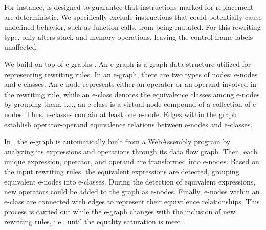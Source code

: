 For instance, \tool is designed to guarantee that instructions marked for replacement are deterministic. 
We specifically exclude instructions that could potentially cause undefined behavior, such as function calls, from being mutated. 
For this rewriting type, \tool only alters stack and memory operations, leaving the control frame labels unaffected.





\label{alg}


We build \tool on top of e-graphs \cite{10.1145/3571207}.
An e-graph is a graph data structure utilized for representing rewriting rules. 
In an e-graph, there are two types of nodes: e-nodes and e-classes. 
An e-node represents either an operator or an operand involved in the rewriting rule, while an e-class denotes the equivalence classes among e-nodes by grouping them, i.e., an e-class is a virtual node compound of a collection of e-nodes. 
Thus, e-classes contain at least one e-node.
Edges within the graph establish operator-operand equivalence relations between e-nodes and e-classes.

In \tool, the e-graph is automatically built from a WebAssembly program by analyzing its expressions and operations through its data flow graph.
Then, each unique expression, operator, and operand are transformed into e-nodes.
Based on the input rewriting rules, the equivalent expressions are detected, grouping equivalent e-nodes into e-classes.
During the detection of equivalent expressions, new operators could be added to the graph as e-nodes.
Finally, e-nodes within an e-class are connected with edges to represent their equivalence relationships.
This process is carried out while the e-graph changes with the inclusion of new rewriting rules, i.e., until the equality saturation is meet \cite{equality-saturation}.

